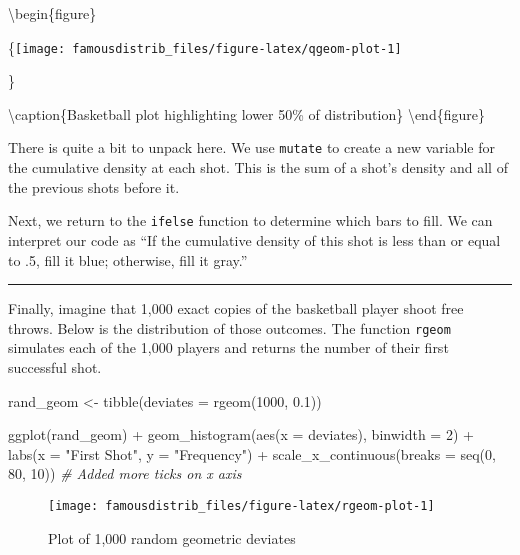 \documentclass[
]{article}
\newenvironment{Shaded}{\begin{snugshade}}{\end{snugshade}}
\newcommand{\AttributeTok}[1]{\textcolor[rgb]{0.77,0.63,0.00}{#1}}
\newcommand{\CommentTok}[1]{\textcolor[rgb]{0.56,0.35,0.01}{\textit{#1}}}
\newcommand{\DecValTok}[1]{\textcolor[rgb]{0.00,0.00,0.81}{#1}}
\newcommand{\FloatTok}[1]{\textcolor[rgb]{0.00,0.00,0.81}{#1}}
\newcommand{\FunctionTok}[1]{\textcolor[rgb]{0.00,0.00,0.00}{#1}}
\newcommand{\NormalTok}[1]{#1}
\newcommand{\OtherTok}[1]{\textcolor[rgb]{0.56,0.35,0.01}{#1}}
\newcommand{\SpecialCharTok}[1]{\textcolor[rgb]{0.00,0.00,0.00}{#1}}
\newcommand{\StringTok}[1]{\textcolor[rgb]{0.31,0.60,0.02}{#1}}
\begin{document}
\textbackslash begin\{figure\}

\{\centering \texttt{[image: famousdistrib\_files/figure-latex/qgeom-plot-1]}

\}

\textbackslash caption\{Basketball plot highlighting lower 50\% of distribution\}\label{fig:qgeom-plot}
\textbackslash end\{figure\}

There is quite a bit to unpack here. We use \texttt{mutate} to create a new variable for the cumulative density at each shot. This is the sum of a shot's density and all of the previous shots before it.

Next, we return to the \texttt{ifelse} function to determine which bars to fill. We can interpret our code as ``If the cumulative density of this shot is less than or equal to .5, fill it blue; otherwise, fill it gray.''

\begin{center}\rule{0.5\linewidth}{0.5pt}\end{center}

Finally, imagine that 1,000 exact copies of the basketball player shoot free throws. Below is the distribution of those outcomes. The function \texttt{rgeom} simulates each of the 1,000 players and returns the number of their first successful shot.

\begin{Shaded}
\begin{Highlighting}[]
\NormalTok{rand\_geom }\OtherTok{\textless{}{-}} \FunctionTok{tibble}\NormalTok{(}\AttributeTok{deviates =} \FunctionTok{rgeom}\NormalTok{(}\DecValTok{1000}\NormalTok{, }\FloatTok{0.1}\NormalTok{))}

\FunctionTok{ggplot}\NormalTok{(rand\_geom) }\SpecialCharTok{+}
  \FunctionTok{geom\_histogram}\NormalTok{(}\FunctionTok{aes}\NormalTok{(}\AttributeTok{x =}\NormalTok{ deviates),}
                 \AttributeTok{binwidth =} \DecValTok{2}\NormalTok{) }\SpecialCharTok{+}
  \FunctionTok{labs}\NormalTok{(}\AttributeTok{x =} \StringTok{"First Shot"}\NormalTok{, }\AttributeTok{y =} \StringTok{"Frequency"}\NormalTok{) }\SpecialCharTok{+}
  \FunctionTok{scale\_x\_continuous}\NormalTok{(}\AttributeTok{breaks =} \FunctionTok{seq}\NormalTok{(}\DecValTok{0}\NormalTok{, }\DecValTok{80}\NormalTok{, }\DecValTok{10}\NormalTok{)) }\CommentTok{\# Added more ticks on x axis}
\end{Highlighting}
\end{Shaded}

\begin{figure}

{\centering \texttt{[image: famousdistrib\_files/figure-latex/rgeom-plot-1]} 

}

\caption{Plot of 1,000 random geometric deviates}\label{fig:rgeom-plot}
\end{figure}
\end{document}
